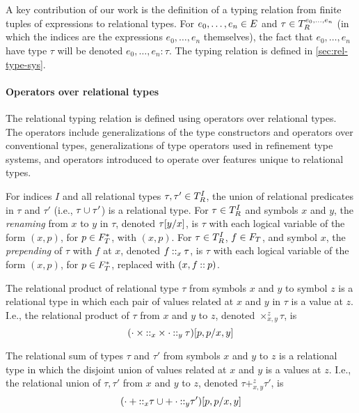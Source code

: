 A key contribution of our work is the definition of a typing relation
from finite tuples of expressions to relational types.
%
For $e_0, \ldots, e_n \in \expr$ and
$\tau \in \reltypes{e_0, \ldots, e_n}$ (in which the indices are the
expressions $e_0, \ldots, e_n$ themselves), the fact that
$e_0, \ldots, e_n$ have type $\tau$ will be denoted
$e_0, \ldots, e_n : \tau$.
%
The typing relation is defined in \autoref{sec:rel-type-sys}.

\paragraph{Operators over relational types}
The relational typing relation is defined using operators over
relational types.
%
The operators include generalizations of the type constructors and
operators over conventional types, generalizations of type operators
used in refinement type systems, and operators introduced to operate
over features unique to relational types.

For indices $I$ and all relational types
$\tau, \tau' \in \reltypes{I}$, the union of relational predicates in
$\tau$ and $\tau'$ (i.e., $\tau \union \tau'$) is a relational type.
For $\tau \in \reltypes{I}$ and symbols $x$ and $y$, the \emph{renaming}
from $x$ to $y$ in $\tau$, denoted $\replace{\tau}{x}{y}$, is $\tau$
with each logical variable of the form $(x, p)$, for $p \in \typepos$,
with $(x, p)$.
For $\tau \in \reltypes{I}$, $f \in \typosfields$, and symbol $x$, the
\emph{prepending} of $\tau$ with $f$ at $x$, denoted $f \cons_x \tau$,
is $\tau$ with each logical variable of the form $(x, p)$, for
$p \in \typepos$, replaced with $(x, f \cons p)$.

The relational product of relational type $\tau$ from symbols $x$ and
$y$ to symbol $z$ is a relational type in which each pair of values
related at $x$ and $y$ in $\tau$ is a value at $z$.
%
I.e., the relational product of $\tau$ from $x$ and $y$ to $z$,
denoted $\times_{x, y}^z \tau$, is
\[ \replace{ (\tyleftprod \cons_x \tyrightprod \cons_y \tau) }{ x, y }{ p, p }
\]

The relational sum of types $\tau$ and $\tau'$ from symbols $x$ and
$y$ to $z$ is a relational type in which the disjoint union of values
related at $x$ and $y$ is a values at $z$.
%
I.e., the relational union of $\tau, \tau'$ from $x$ and $y$ to $z$,
denoted $\tau +_{x, y}^z \tau'$, is
\[ \replace{ (\tyleftsum \cons_x \tau \union \tyrightsum \cons_y
    \tau')}{ x, y }{ p, p }
\]

